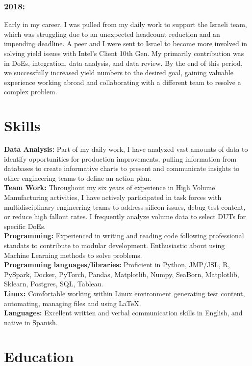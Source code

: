 \documentclass{article}
\begin{document}
\subsubsection{2018:}
Early in my career, I was pulled from my daily work to support the Israeli team, which was struggling due to an unexpected headcount reduction and an impending deadline. A peer and I were sent to Israel to become more involved in solving yield issues with Intel's Client 10th Gen. My primarily contribution was in DoEs, integration, data analysis, and data review. By the end of this period, we successfully increased yield numbers to the desired goal, gaining valuable experience working abroad and collaborating with a different team to resolve a complex problem.

\section{Skills}
\noindent\textbf{Data Analysis:} Part of my daily work, I have analyzed vast amounts of data to identify opportunities for production improvements, pulling information from databases to create informative charts to present and communicate insights to other engineering teams to define an action plan.\\
\textbf{Team Work:} Throughout my six years of experience in High Volume Manufacturing activities, I have actively participated in task forces with multidisciplinary engineering teams to address silicon issues, debug test content, or reduce high fallout rates. I frequently analyze volume data to select DUTs for specific DoEs.\\
\textbf{Programming:} Experienced in writing and reading code following professional standats to contribute to modular development. Enthusiastic about using Machine Learning methods to solve problems.\\
\textbf{Programming languages/libraries:} Proficient in Python, JMP/JSL, R, PySpark, Docker, PyTorch, Pandas, Matplotlib, Numpy, SeaBorn, Matplotlib, Sklearn, Postgres, SQL, Tableau.\\
\textbf{Linux:} Comfortable working within Linux environment generating test content, automating, managing files and using \LaTeX .\\
\textbf{Languages:} Excellent written and verbal communication skills in English, and native in Spanish.

\section{Education}
\end{document}
